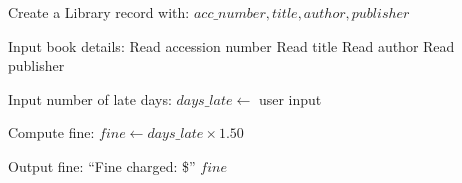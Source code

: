 \begin{algorithm}
\caption{Library Fine Calculation for Late Return of Books}
\begin{algorithmic}[1]

\STATE Create a Library record with:
\STATE $acc\_number, title, author, publisher$

\STATE Input book details:
\STATE Read accession number
\STATE Read title
\STATE Read author
\STATE Read publisher

\STATE Input number of late days:
\STATE $days\_late \gets$ user input

\STATE Compute fine:
\STATE $fine \gets days\_late \times 1.50$

\STATE Output fine:
\STATE ``Fine charged: \$'' $fine$

\end{algorithmic}
\end{algorithm}
